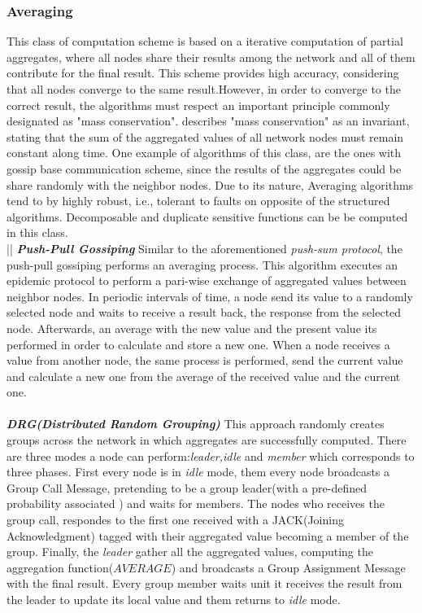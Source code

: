 \subsubsection{Averaging}
This class of computation scheme is based on a iterative computation of partial aggregates, where all nodes share their results among the network and all of them contribute for the final result. This scheme provides high accuracy, considering that all nodes converge to the same result.However, in order to converge to the correct result, the algorithms must respect an important principle commonly designated as "mass conservation". \cite{journals/corr/abs-1110-0725} describes "mass conservation" as an invariant, stating that the sum of the aggregated values of all network nodes must remain constant along time. One example of algorithms of this class, are the ones with gossip base communication scheme, since the results of the aggregates could be share randomly with the neighbor nodes. Due to its nature, Averaging algorithms tend to by highly robust, i.e., tolerant to faults on opposite of the structured algorithms. Decomposable and duplicate sensitive functions can be be computed in this class.\\
||
\textbf{\textit{Push-Pull Gossiping}} Similar to the aforementioned \textit{push-sum protocol}, the push-pull gossiping\cite{jelasity2004epidemic} performs an averaging process. This algorithm executes an epidemic protocol to perform a pari-wise exchange of aggregated values between neighbor nodes\cite{journals/corr/abs-1110-0725}. In periodic intervals of time, a node send its value to a randomly selected node and waits to receive a result back, the response from the selected node. Afterwards, an average with the new value and the present value its performed in order to calculate and store a new one. When a node receives a value from another node, the same process is performed, send the current value and calculate a new one from the average of the received value and the current one.\\ 
\\
\textbf{\textit{DRG(Distributed Random Grouping)}} This approach \cite{chen2006robust} randomly creates groups across the network in which aggregates are successfully computed. There are three modes a node can perform:\textit{leader,idle} and \textit{member} which corresponds to three phases. First every node is in \textit{idle} mode, them every node broadcasts a Group Call Message, pretending to be a group leader(with a pre-defined probability associated ) and waits for members. The nodes who receives the group call, respondes to the first one received with a JACK(Joining Acknowledgment) tagged with their aggregated value becoming a member of the group. Finally, the \textit{leader} gather all the aggregated values, computing the aggregation function($AVERAGE$) and broadcasts a Group Assignment Message with the  final result. Every group member waits unit it receives the result from the leader to update its local value and them returns to  \textit{idle} mode.\\
\\

